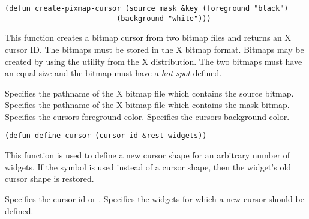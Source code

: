 \begin{lispd}
\syntax\begin{verbatim}
(defun create-pixmap-cursor (source mask &key (foreground "black")
					      (background "white")))
\end{verbatim}
\beschr This function creates a bitmap cursor from two bitmap files and returns
an X cursor ID.  The bitmaps must be stored in the X bitmap format.  Bitmaps may
be created by using the  utility from the X distribution.  The two
bitmaps must have an equal size and the  bitmap must have a
{\em hot spot} defined. 

\parameter
\begin{paramd}
 Specifies the pathname of the X bitmap file which contains the
source bitmap.
 Specifies the pathname of the X bitmap file which contains the
mask bitmap.
 Specifies the cursors foreground color.
 Specifies the cursors background color.
\end{paramd}
\end{lispd}

\begin{lispd}
\syntax\begin{verbatim}
(defun define-cursor (cursor-id &rest widgets))
\end{verbatim}
\beschr This function is used to define a new cursor shape for an arbitrary
number of widgets. If the symbol  is used instead of a cursor shape,
then the widget's old cursor shape is restored.
\parameter
\begin{paramd}
 Specifies the cursor-id or .
 Specifies the widgets for which a new cursor should be defined.
\end{paramd}
\end{lispd}

